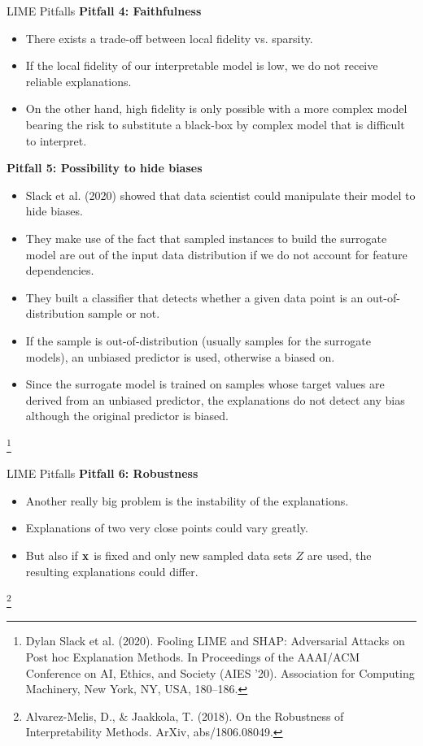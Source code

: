 \documentclass[11pt,compress,t,notes=noshow, xcolor=table]{beamer}
\begin{document}
\begin{vbframe}{LIME Pitfalls}
\textbf{Pitfall 4: Faithfulness}
\begin{itemize}
	\item There exists a trade-off between local fidelity vs. sparsity. 
	\item If the local fidelity of our interpretable model is low, we do not receive reliable explanations.
	\item On the other hand, high fidelity is only possible with a more complex model bearing the risk to substitute a black-box by complex model that is difficult to interpret.
\end{itemize}
\framebreak

\textbf{Pitfall 5: Possibility to hide biases}
\begin{itemize}
	\item Slack et al. (2020) showed that data scientist could manipulate their model to hide biases. 
	\item They make use of the fact that sampled instances to build the surrogate model are out of the input data distribution if we do not account for feature dependencies. 
	\item They built a classifier that detects whether a given data point is an out-of-distribution sample or not. 
	\item If the sample is out-of-distribution (usually samples for the surrogate models), an unbiased predictor is used, otherwise a biased on. 
	\item Since the surrogate model is trained on samples whose target values are derived from an unbiased predictor, the explanations do not detect any bias although the original predictor is biased. 
\end{itemize}
\footnote[frame]{Dylan Slack et al. (2020). Fooling LIME and SHAP: Adversarial Attacks on Post hoc Explanation Methods. In Proceedings of the AAAI/ACM Conference on AI, Ethics, and Society (AIES '20). Association for Computing Machinery, New York, NY, USA, 180–186.}
\end{vbframe}

\begin{vbframe}{LIME Pitfalls}
\textbf{Pitfall 6: Robustness}
\begin{itemize}
	\item Another really big problem is the instability of the explanations. 
	\item Explanations of two very close points could vary greatly. 
	\item But also if $\xv$ is fixed and only new sampled data sets $Z$ are used, the resulting explanations could differ.  
\end{itemize}
\footnote[frame]{Alvarez-Melis, D., \& Jaakkola, T. (2018). On the Robustness of Interpretability Methods. ArXiv, abs/1806.08049.}
\end{vbframe}
\end{document}
